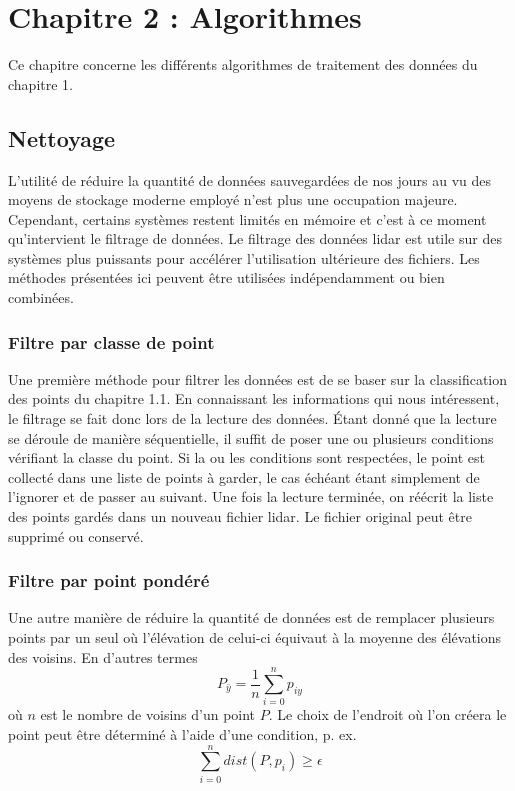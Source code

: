 \chapter{Chapitre 2 : Algorithmes}

Ce chapitre concerne les différents algorithmes de traitement des données du chapitre 1.

\section{Nettoyage}

L'utilité de réduire la quantité de données sauvegardées de nos jours au vu des moyens de stockage moderne employé n'est plus une occupation majeure.
Cependant, certains systèmes restent limités en mémoire et c'est à ce moment qu'intervient le filtrage de données.
Le filtrage des données \gls{lidar} est utile sur des systèmes plus puissants pour accélérer l'utilisation ultérieure des fichiers. Les méthodes présentées ici peuvent être utilisées indépendamment ou bien combinées.

\subsection{Filtre par classe de point}
Une première méthode pour filtrer les données est de se baser sur la classification des points du chapitre 1.1. En connaissant les informations qui nous intéressent, le filtrage se fait donc lors de la lecture des données.
Étant donné que la lecture se déroule de manière séquentielle, il suffit de poser une ou plusieurs conditions vérifiant la classe du point.
Si la ou les conditions sont respectées, le point est collecté dans une liste de points à garder, le cas échéant étant simplement de l'ignorer et de passer au suivant.
Une fois la lecture terminée, on réécrit la liste des points gardés dans un nouveau fichier \gls{lidar}.
Le fichier original peut être supprimé ou conservé.

\subsection{Filtre par point pondéré}

Une autre manière de réduire la quantité de données est de remplacer plusieurs points par un seul où l'élévation de celui-ci équivaut à la moyenne des élévations des voisins.
En d'autres termes $$ P_{\bar{y}} = \frac{1}{n} \sum_{i=0}^{n} p_{iy} $$
où $n$ est le nombre de voisins d'un point $P$. 
Le choix de l'endroit où l'on créera le point peut être déterminé à l'aide d'une condition, p. ex. $$\sum_{i=0}^n dist(P, p_i) \geq \epsilon$$

